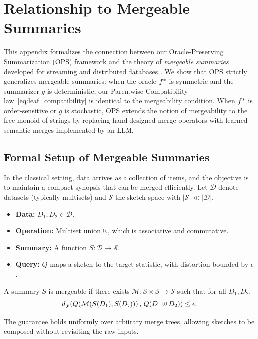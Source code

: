 \section{Relationship to Mergeable Summaries}\label{app:mergeable}

This appendix formalizes the connection between our Oracle-Preserving Summarization (OPS) framework and the theory of \emph{mergeable summaries} developed for streaming and distributed databases \citep{Agarwal2013MergeableTODS}. We show that OPS strictly generalizes mergeable summaries: when the oracle $f^{\ast}$ is symmetric and the summarizer $g$ is deterministic, our Parentwise Compatibility law~\eqref{eq:leaf_compatibility} is identical to the mergeability condition. When $f^{\ast}$ is order-sensitive or $g$ is stochastic, OPS extends the notion of mergeability to the free monoid of strings by replacing hand-designed merge operators with learned semantic merges implemented by an LLM.

\subsection{Formal Setup of Mergeable Summaries}

In the classical setting, data arrives as a collection of items, and the objective is to maintain a compact synopsis that can be merged efficiently. Let $\mathcal{D}$ denote datasets (typically multisets) and $\mathcal{S}$ the sketch space with $|\mathcal{S}|\ll|\mathcal{D}|$.
\begin{itemize}
    \item \textbf{Data:} $D_1, D_2 \in \mathcal{D}$.
    \item \textbf{Operation:} Multiset union $\uplus$, which is associative and commutative.
    \item \textbf{Summary:} A function $S:\mathcal{D}\to\mathcal{S}$.
    \item \textbf{Query:} $Q$ maps a sketch to the target statistic, with distortion bounded by $\epsilon$.
\end{itemize}

\begin{definition}
A summary $S$ is mergeable if there exists $\mathcal{M}:\mathcal{S}\times\mathcal{S}\to\mathcal{S}$ such that for all $D_1,D_2$,
\[
    d_{\mathcal{Y}}\!\left(Q\!\left(\mathcal{M}(S(D_1),S(D_2))\right),\, Q(D_1\uplus D_2)\right) \le \epsilon.
\]
\end{definition}

The guarantee holds uniformly over arbitrary merge trees, allowing sketches to be composed without revisiting the raw inputs.

